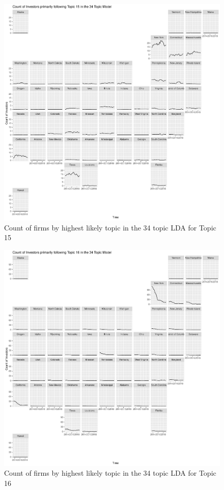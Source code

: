 		\begin{figure}
		\centering
		\includegraphics[width=1\linewidth]{Figures/ChapterV/USA_34_Topic15.pdf}
		\caption[Count of Firms for Topic 15 by Quarter]{Count of firms by highest likely topic in the 34 topic LDA for Topic 15}
		\label{fig:StateLDA15}
	\end{figure}
	
		\begin{figure}
		\centering
		\includegraphics[width=1\linewidth]{Figures/ChapterV/USA_34_Topic16.pdf}
		\caption[Count of Firms for Topic 16 by Quarter]{Count of firms by highest likely topic in the 34 topic LDA for Topic 16}
		\label{fig:StateLDA16}
	\end{figure}
	
